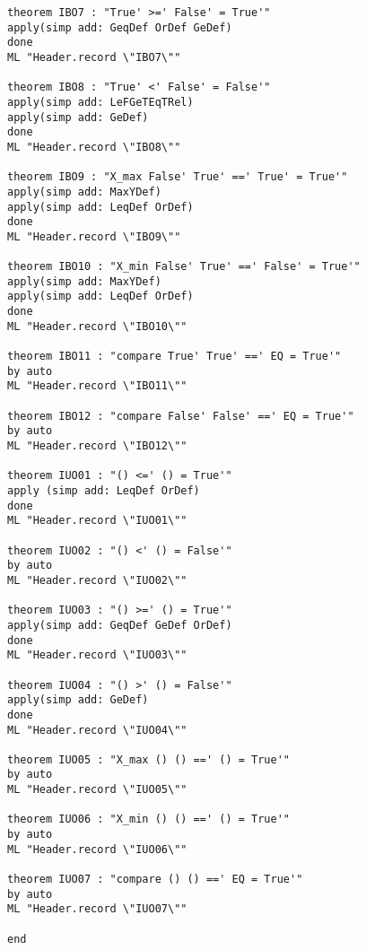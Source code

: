 \begin{multicols}{2}
\begin{Verbatim}
theorem IBO7 : "True' >=' False' = True'"
apply(simp add: GeqDef OrDef GeDef)
done
ML "Header.record \"IBO7\""

theorem IBO8 : "True' <' False' = False'"
apply(simp add: LeFGeTEqTRel)
apply(simp add: GeDef)
done
ML "Header.record \"IBO8\""

theorem IBO9 : "X_max False' True' ==' True' = True'"
apply(simp add: MaxYDef)
apply(simp add: LeqDef OrDef)
done
ML "Header.record \"IBO9\""

theorem IBO10 : "X_min False' True' ==' False' = True'"
apply(simp add: MaxYDef)
apply(simp add: LeqDef OrDef)
done
ML "Header.record \"IBO10\""

theorem IBO11 : "compare True' True' ==' EQ = True'"
by auto
ML "Header.record \"IBO11\""

theorem IBO12 : "compare False' False' ==' EQ = True'"
by auto
ML "Header.record \"IBO12\""

theorem IUO01 : "() <=' () = True'"
apply (simp add: LeqDef OrDef)
done
ML "Header.record \"IUO01\""

theorem IUO02 : "() <' () = False'"
by auto
ML "Header.record \"IUO02\""

theorem IUO03 : "() >=' () = True'"
apply(simp add: GeqDef GeDef OrDef)
done
ML "Header.record \"IUO03\""

theorem IUO04 : "() >' () = False'"
apply(simp add: GeDef)
done
ML "Header.record \"IUO04\""

theorem IUO05 : "X_max () () ==' () = True'"
by auto
ML "Header.record \"IUO05\""

theorem IUO06 : "X_min () () ==' () = True'"
by auto
ML "Header.record \"IUO06\""

theorem IUO07 : "compare () () ==' EQ = True'"
by auto
ML "Header.record \"IUO07\""

end
\end{Verbatim}
\end{multicols}

